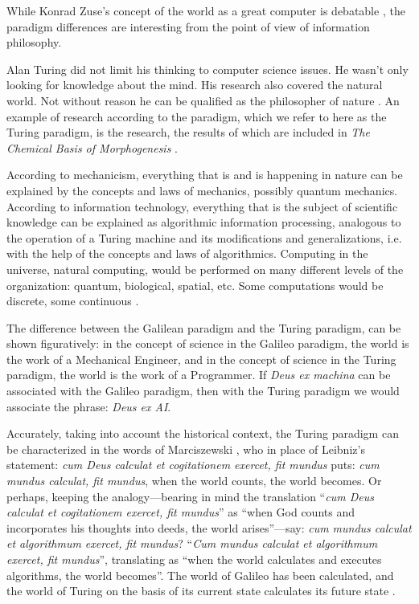 \documentclass[pdftex,12pt]{article}
\begin{document}
While Konrad Zuse's concept of the world as a great computer is debatable \parencite[paragraphs: ``Zuse thesis'', and ``Examining Zuse's thesis'']{CopelandSprevakShagrir2017}, the paradigm differences are interesting from the point of view of information philosophy.

Alan Turing did not limit his thinking to computer science issues. He wasn't only looking for knowledge about the mind. His research also covered the natural world. Not without reason he can be qualified as the philosopher of nature \parencite{Hodges1997}. An example of research according to the paradigm, which we refer to here as the Turing paradigm, is the research, the results of which are included in \emph{The Chemical Basis of Morphogenesis} \parencite*{Turing1952a}.

According to mechanicism, everything that is and is happening in nature can be explained by the concepts and laws of mechanics, possibly quantum mechanics. According to information technology, everything that is the subject of scientific knowledge can be explained as algorithmic information processing, analogous to the operation of a Turing machine and its modifications and generalizations, i.e. with the help of the concepts and laws of algorithmics. Computing in the universe, natural computing, would be performed on many different levels of the organization: quantum, biological, spatial, etc. Some computations would be discrete, some continuous \parencite{Lesne2007}.

The difference between the Galilean paradigm and the Turing paradigm, can be shown figuratively: in the concept of science in the Galileo paradigm, the world is the work of a Mechanical Engineer, and in the concept of science in the Turing paradigm, the world is the work of a Programmer. If \emph{Deus ex machina} can be associated with the Galileo paradigm, then with the Turing paradigm we would associate the phrase: \emph{Deus ex AI}.

Accurately, taking into account the historical context, the Turing paradigm can be characterized in the words of Marciszewski \parencite[p.153]{MarciszewskiStacewicz2011}, who in place of Leibniz's statement: \emph{cum Deus calculat et cogitationem exercet, fit mundus} puts: \emph{cum mundus calculat, fit mundus}, when the world counts, the world becomes. Or perhaps, keeping the analogy---bearing in mind the translation ``\emph{cum Deus calculat et cogitationem exercet, fit mundus}'' as ``when God counts and incorporates his thoughts into deeds, the world arises''---say: \emph{cum mundus calculat et algorithmum exercet, fit mundus}? ``\emph{Cum mundus calculat et algorithmum exercet, fit mundus}'', translating as ``when the world calculates and executes algorithms, the world becomes''. The world of Galileo has been calculated, and the world of Turing on the basis of its current state calculates its future state \parencite[p.13]{Chaitin2007a}.
\end{document}
